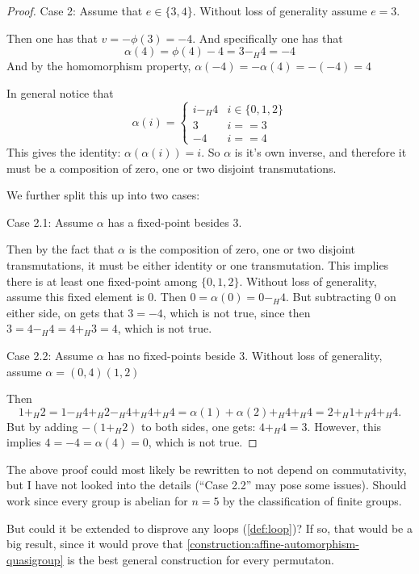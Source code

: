 \begin{proof}
    Case 2: Assume that \( e \in \{ 3, 4 \} \). Without loss of generality assume \( e = 3 \).

    Then one has that \( v = -\phi(3) = -4 \). And specifically one has that
    \[
        \alpha(4) = \phi(4) - 4 = 3 -_H 4 = - 4
    \]
    And by the homomorphism property, \( \alpha(-4) = -\alpha(4) = -(-4) = 4 \)

    In general notice that
    \[
        \alpha(i) =
        \begin{cases}
            i -_H 4 & i \in \{ 0, 1, 2 \} \\
            3 & i == 3 \\
            -4 & i == 4
        \end{cases}
    \]
    This gives the identity: \( \alpha(\alpha(i)) = i \). So \( \alpha \) is it's own inverse, and therefore it must be a composition of zero, one or two disjoint transmutations.

    We further split this up into two cases:

    Case 2.1: Assume \( \alpha \) has a fixed-point besides \( 3 \).

    Then by the fact that \( \alpha \) is the composition of zero, one or two disjoint transmutations, it must be either identity or one transmutation. This implies there is at least one fixed-point among \( \{ 0, 1, 2 \} \). Without loss of generality, assume this fixed element is \( 0 \). Then \( 0 = \alpha(0) = 0 -_H 4 \). But subtracting \( 0 \) on either side, on gets that \( 3 = -4 \), which is not true, since then \( 3 = 4 -_H 4 = 4 +_H 3 = 4 \), which is not true.

    Case 2.2: Assume \( \alpha \) has no fixed-points beside \( 3 \). Without loss of generality, assume \( \alpha = (0, 4)(1, 2) \)

    Then 
    \[ 
        1 +_H 2 = 1 -_H 4 +_H 2 -_H 4 +_H 4 +_H 4 = \alpha(1) + \alpha(2) +_H 4 +_H 4 = 2 +_H 1 +_H 4 +_H 4.
    \]
    But by adding \( -(1 +_H 2) \) to both sides, one gets: \( 4 +_H 4 = 3\). However, this implies \( 4 = -4 = \alpha(4) = 0 \), which is not true.
\end{proof}

\begin{remark} \label{remark:ab-aaut-counterexample-notes}
    The above proof could most likely be rewritten to not depend on commutativity, but I have not looked into the details (``Case 2.2'' may pose some issues). Should work since every group is abelian for \( n = 5 \) by the classification of finite groups. 
    
    But could it be extended to disprove any loops (\autoref{def:loop})? If so, that would be a big result, since it would prove that \autoref{construction:affine-automorphism-quasigroup} is the best general construction for every permutaton.
\end{remark}